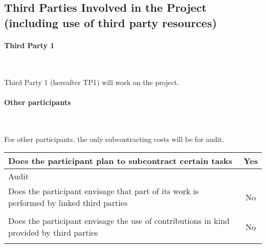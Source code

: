 \documentclass[noworkareas,deliverables,\classoptions]{euproposal}       %
\begin{document}
\begin{proposal}






\subsection{Third Parties Involved in the Project (including use of third party resources)}
\label{section:ThirdParties}

\paragraph{Third Party 1}\ 


Third Party 1 (hereafter TP1) will work on the project.

\paragraph{Other participants}\ 

For other participants, the only subcontracting costs will be for audit.

\bgroup
\def\arraystretch{1.5}  %
\noindent \begin{tabular}{|p{}|c|}
\hline
Does the participant plan to subcontract certain
tasks & Yes \\
\hline
\multicolumn{2}{|l|}{Audit} \\
\hline
Does the participant envisage that part of its work
is performed by linked third parties & No \\
\hline
\multicolumn{2}{|l|}{} \\
\hline
Does the participant envisage the use of
contributions in kind provided by
third parties & No \\
\hline
\multicolumn{2}{|l|}{} \\
\hline
\end{tabular}
\egroup



\newpage


\end{proposal}
\end{document}
